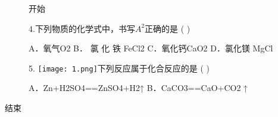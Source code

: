 \documentclass{article}%
\begin{document}
%
\normalsize%
%
\begin{figure}
开始
\end{figure}

\begin{figure}
4.下列物质的化学式中，书写$ A ^ 2 $正确的是 (	) 

A．氧气O2	B． 氯 化 铁 FeCl2 C．氧化钙CaO2	D．氯化镁 MgCl
\end{figure}

\begin{figure}[ht]  
5.    \texttt{[image: 1.png]}下列反应属于化合反应的是 (	)  
 
   A．Zn+H2SO4==ZnSO4+H2↑		B．CaCO3==CaO+CO2 ↑
\end{figure}


结束
\end{document}
